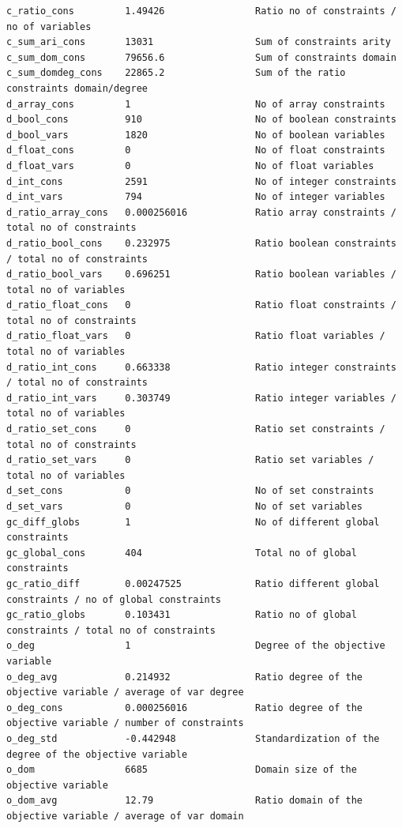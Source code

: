 \documentclass[../../main]{subfiles}
\begin{document}
\begin{lstlisting}
c_ratio_cons         1.49426                Ratio no of constraints / no of variables
c_sum_ari_cons       13031                  Sum of constraints arity
c_sum_dom_cons       79656.6                Sum of constraints domain
c_sum_domdeg_cons    22865.2                Sum of the ratio constraints domain/degree
d_array_cons         1                      No of array constraints
d_bool_cons          910                    No of boolean constraints
d_bool_vars          1820                   No of boolean variables
d_float_cons         0                      No of float constraints
d_float_vars         0                      No of float variables
d_int_cons           2591                   No of integer constraints
d_int_vars           794                    No of integer variables
d_ratio_array_cons   0.000256016            Ratio array constraints / total no of constraints
d_ratio_bool_cons    0.232975               Ratio boolean constraints / total no of constraints
d_ratio_bool_vars    0.696251               Ratio boolean variables / total no of variables
d_ratio_float_cons   0                      Ratio float constraints / total no of constraints
d_ratio_float_vars   0                      Ratio float variables / total no of variables
d_ratio_int_cons     0.663338               Ratio integer constraints / total no of constraints
d_ratio_int_vars     0.303749               Ratio integer variables / total no of variables
d_ratio_set_cons     0                      Ratio set constraints / total no of constraints
d_ratio_set_vars     0                      Ratio set variables / total no of variables
d_set_cons           0                      No of set constraints
d_set_vars           0                      No of set variables
gc_diff_globs        1                      No of different global constraints
gc_global_cons       404                    Total no of global constraints
gc_ratio_diff        0.00247525             Ratio different global constraints / no of global constraints
gc_ratio_globs       0.103431               Ratio no of global constraints / total no of constraints
o_deg                1                      Degree of the objective variable
o_deg_avg            0.214932               Ratio degree of the objective variable / average of var degree
o_deg_cons           0.000256016            Ratio degree of the objective variable / number of constraints
o_deg_std            -0.442948              Standardization of the degree of the objective variable
o_dom                6685                   Domain size of the objective variable
o_dom_avg            12.79                  Ratio domain of the objective variable / average of var domain

\end{lstlisting}
\end{document}
